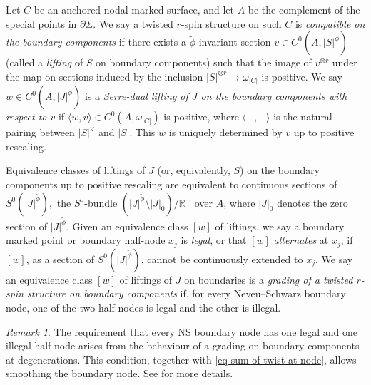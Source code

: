 \documentclass[11pt]{amsart}
\theoremstyle{definition}
\theoremstyle{remark}
\newtheorem{rmk}[dummy]{Remark}
\newcommand{\<}{\left<}
\renewcommand{\>}{\right>}
\numberwithin{equation}{section}
\begin{document}
Let $C$ be an anchored nodal marked surface, and let $A$ be the complement of the special points in $\partial \Sigma$.  We say a twisted $r$-spin structure on such $C$ is \textit{compatible on the boundary components} if there exists a $\widetilde{\phi}$-invariant section $v \in C^0\left(A, |S|^{\widetilde{\phi}}\right)$ (called a \textit{lifting} of $S$  on boundary components) such that the image of $v^{\otimes r}$ under the map on sections induced by the inclusion $|S|^{\otimes r} \to  \omega_{|C|}$ is positive.  We say $w \in C^0\left(A, |J|^{\widetilde{\phi}}\right)$ is a \textit{Serre-dual lifting of $J$ on the boundary components with respect to $v$} if $\langle w, v \rangle \in C^0(A, \omega_{|C|})$ is positive, where $\langle -, - \rangle$ is the natural pairing between $|S|^{\vee}$ and $|S|$.  This $w$ is uniquely determined by $v$ up to positive rescaling.

 Equivalence classes of liftings of %
$J$ (or, equivalently, %
$S$) on the boundary components up to positive rescaling are equivalent to continuous sections of $S^0(|J|^{\widetilde\phi}),$ the $S^0$-bundle $\left(|J|^{\widetilde{\phi}}\setminus |J|_0\right)\big/ \mathbb R_+$ over $A$, where $|J|_0$ denotes the zero section of $|J|^{\widetilde{\phi}}$. Given an equivalence class $[w]$  of liftings, we say a boundary marked point or boundary half-node $x_j$ is \textit{legal}, or that $[w]$ \textit{alternates} at $x_j$, if $[w]$, as a section of $S^0(|J|^{\widetilde\phi})$, cannot be continuously extended to $x_j$.
We say an equivalence class $[w]$ of liftings of $J$ on boundaries is a \textit{grading of a twisted $r$-spin structure on boundary components} if, for every Neveu--Schwarz boundary node, one of the two half-nodes is legal and the other is illegal. 
\begin{rmk}
    The requirement that every NS boundary node has one legal and one illegal half-node arises from the behaviour of a grading on %
boundary components at degenerations. This condition, together with \eqref{eq sum of twist at node}, allows smoothing %
the boundary node. See \cite{BCT1} for more details.
\end{rmk}
\end{document}
